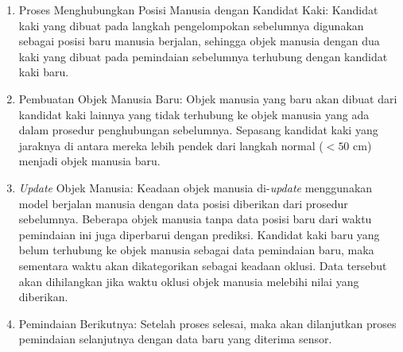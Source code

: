 \begin{enumerate}
        \item Proses Menghubungkan Posisi Manusia dengan Kandidat Kaki: Kandidat kaki yang dibuat pada langkah pengelompokan sebelumnya digunakan sebagai posisi baru manusia berjalan, sehingga objek manusia dengan dua kaki yang dibuat pada pemindaian sebelumnya terhubung dengan kandidat kaki baru.
        \item Pembuatan Objek Manusia Baru: Objek manusia yang baru akan dibuat dari kandidat kaki lainnya yang tidak terhubung ke objek manusia yang ada dalam prosedur penghubungan sebelumnya. Sepasang kandidat kaki yang jaraknya di antara mereka lebih pendek dari langkah normal ($<50$ cm) menjadi objek manusia baru.
        \item \textit{Update} Objek Manusia: Keadaan objek manusia di-\textit{update} menggunakan model berjalan manusia dengan data posisi diberikan dari prosedur sebelumnya. Beberapa objek manusia tanpa data posisi baru dari waktu pemindaian ini juga diperbarui dengan prediksi. Kandidat kaki baru yang belum terhubung ke objek manusia sebagai data pemindaian baru, maka sementara waktu akan dikategorikan sebagai keadaan oklusi. Data tersebut akan dihilangkan jika waktu oklusi objek manusia melebihi nilai yang diberikan.
        \item Pemindaian Berikutnya: Setelah proses selesai, maka akan dilanjutkan proses pemindaian selanjutnya dengan data baru yang diterima sensor.
    \end{enumerate}

